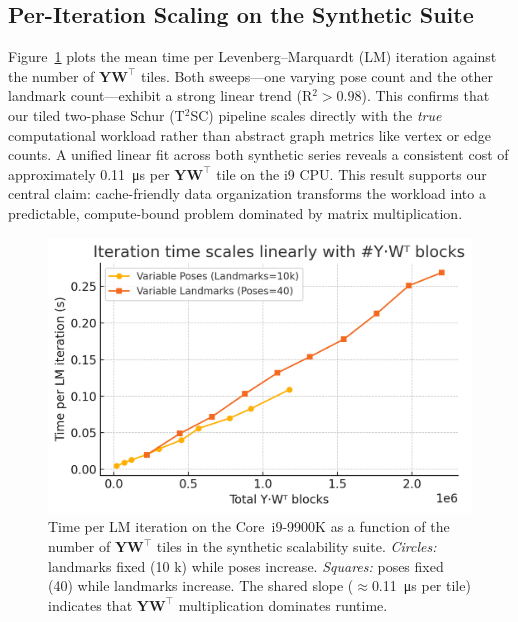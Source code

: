 \subsection{Per-Iteration Scaling on the Synthetic Suite}
\label{subsec:results_itercost}
Figure~\ref{fig:results_scaling_synth} plots the mean time per
Levenberg–Marquardt (LM) iteration against the number of
$\mathbf Y\mathbf W^{\!\top}$ tiles. Both sweeps—one varying pose count and the other landmark 
count—exhibit a strong linear trend (R$^{2}\!>\!0.98$). This confirms that our tiled two-phase 
Schur (T$^{2}$SC) pipeline scales directly with the \emph{true} computational workload rather 
than abstract graph metrics like vertex or edge counts. A unified linear fit across both 
synthetic series reveals a consistent cost of approximately \SI{0.11}{\micro\second} per 
$\mathbf Y\mathbf W^{\!\top}$ tile on the i9 CPU. This result supports our central claim: 
cache-friendly data organization transforms the workload into a predictable, compute-bound 
problem dominated by matrix multiplication.

\begin{figure}[t]
  \centering
  \includegraphics[width=\linewidth]{figs/synth_scaling_YWt}
  \caption{Time per LM iteration on the Core~i9-9900K as a
    function of the number of $\mathbf Y\mathbf W^{\!\top}$ tiles
    in the synthetic scalability suite.  \emph{Circles:} landmarks
    fixed (10 k) while poses increase.  \emph{Squares:} poses fixed
    (40) while landmarks increase. The shared slope
    ($\approx$\SI{0.11}{\micro\second} per tile) indicates that
    $\mathbf{Y}\mathbf{W}^{\!\top}$ multiplication dominates runtime.}
  \label{fig:results_scaling_synth}
\end{figure}

